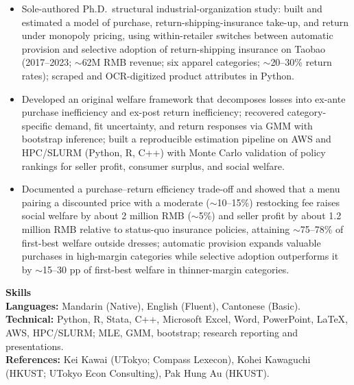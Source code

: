 \documentclass[11pt,letterpaper]{article}
\begin{document}
\begin{itemize}
  \item Sole-authored Ph.D.\ structural industrial-organization study: built and estimated a model of purchase, return-shipping-insurance take-up, and return under monopoly pricing, using within-retailer switches between automatic provision and selective adoption of return-shipping insurance on Taobao (2017--2023; \(\sim\)62M RMB revenue; six apparel categories; \(\sim\)20--30\% return rates); scraped and OCR-digitized product attributes in Python.
  \item Developed an original welfare framework that decomposes losses into ex-ante purchase inefficiency and ex-post return inefficiency; recovered category-specific demand, fit uncertainty, and return responses via GMM with bootstrap inference; built a reproducible estimation pipeline on AWS and HPC/SLURM (Python, R, C++) with Monte Carlo validation of policy rankings for seller profit, consumer surplus, and social welfare.
  \item Documented a purchase--return efficiency trade-off and showed that a menu pairing a discounted price with a moderate (\(\sim\)10--15\%) restocking fee raises social welfare by about 2 million RMB (\(\sim\)5\%) and seller profit by about 1.2 million RMB relative to status-quo insurance policies, attaining \(\sim\)75--78\% of first-best welfare outside dresses; automatic provision expands valuable purchases in high-margin categories while selective adoption outperforms it by \(\sim\)15--30 pp of first-best welfare in thinner-margin categories.
\end{itemize}

\vspace{0.15pt}

{\large \textbf{Skills}}\\[-0.5pt]
\textbf{Languages:} Mandarin (Native), English (Fluent), Cantonese (Basic).\\
\textbf{Technical:} Python, R, Stata, C++, Microsoft Excel, Word, PowerPoint, \LaTeX, AWS, HPC/SLURM; MLE, GMM, bootstrap; research reporting and presentations.\\
\textbf{References:} Kei Kawai (UTokyo; Compass Lexecon), Kohei Kawaguchi (HKUST; UTokyo Econ Consulting), Pak Hung Au (HKUST).
\end{document}
